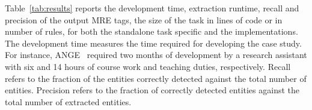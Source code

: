 \begin{table}[tb]
  \centering
   \caption{\label{tab:results}\framework compared to task specific applications.}
\end{table}%

Table~\ref{tab:results} reports the development time,
extraction runtime, recall and precision 
of the output MRE tags, 
the size of the task in lines of code or in number of \framework rules, 
for both the standalone task specific and the \framework implementations.
The development time measures the time required for 
developing the case study.
For instance, ANGE~\cite{ZaMaFlairs2012HadithBio} required two 
months of development by a research assistant with six and 14 hours of 
course work and teaching duties, respectively.
Recall refers to the fraction of the entities correctly detected against the
total number of entities. 
Precision refers to the fraction of correctly
detected entities against the total number of extracted entities. 

